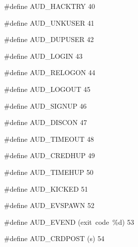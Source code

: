 \documentclass{article}
\begin{document}
\begin{cxxmacro}
{\#define}
        {AUD\_HACKTRY}
        {}
        {}
        {40}
\end{cxxmacro}
\begin{cxxmacro}
{\#define}
        {AUD\_UNKUSER}
        {}
        {}
        {41}
\end{cxxmacro}
\begin{cxxmacro}
{\#define}
        {AUD\_DUPUSER}
        {}
        {}
        {42}
\end{cxxmacro}
\begin{cxxmacro}
{\#define}
        {AUD\_LOGIN}
        {}
        {}
        {43}
\end{cxxmacro}
\begin{cxxmacro}
{\#define}
        {AUD\_RELOGON}
        {}
        {}
        {44}
\end{cxxmacro}
\begin{cxxmacro}
{\#define}
        {AUD\_LOGOUT}
        {}
        {}
        {45}
\end{cxxmacro}
\begin{cxxmacro}
{\#define}
        {AUD\_SIGNUP}
        {}
        {}
        {46}
\end{cxxmacro}
\begin{cxxmacro}
{\#define}
        {AUD\_DISCON}
        {}
        {}
        {47}
\end{cxxmacro}
\begin{cxxmacro}
{\#define}
        {AUD\_TIMEOUT}
        {}
        {}
        {48}
\end{cxxmacro}
\begin{cxxmacro}
{\#define}
        {AUD\_CREDHUP}
        {}
        {}
        {49}
\end{cxxmacro}
\begin{cxxmacro}
{\#define}
        {AUD\_TIMEHUP}
        {}
        {}
        {50}
\end{cxxmacro}
\begin{cxxmacro}
{\#define}
        {AUD\_KICKED}
        {}
        {}
        {51}
\end{cxxmacro}
\begin{cxxmacro}
{\#define}
        {AUD\_EVSPAWN}
        {}
        {}
        {52}
\end{cxxmacro}
\begin{cxxmacro}
{\#define}
        {AUD\_EVEND}
        {(exit\ code\ \%d)}
        {}
        {53}
\end{cxxmacro}
\begin{cxxmacro}
{\#define}
        {AUD\_CRDPOST}
        {(s)}
        {}
        {54}
\end{cxxmacro}
\end{document}
